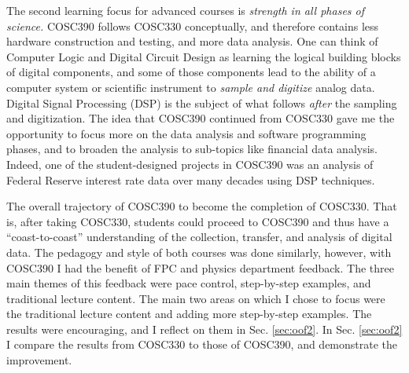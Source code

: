 \documentclass[../../../main.tex]{subfiles}
\begin{document}
The second learning focus for advanced courses is \textit{strength in all phases of science.}  COSC390 follows COSC330 conceptually, and therefore contains less hardware construction and testing, and more data analysis.  One can think of Computer Logic and Digital Circuit Design as learning the logical building blocks of digital components, and some of those components lead to the ability of a computer system or scientific instrument to \textit{sample and digitize} analog data.  Digital Signal Processing (DSP) is the subject of what follows \textit{after} the sampling and digitization.  The idea that COSC390 continued from COSC330 gave me the opportunity to focus more on the data analysis and software programming phases, and to broaden the analysis to sub-topics like financial data analysis.  Indeed, one of the student-designed projects in COSC390 was an analysis of Federal Reserve interest rate data over many decades using DSP techniques. \\ \hspace{0.1cm}

The overall trajectory of COSC390 to become the completion of COSC330.  That is, after taking COSC330, students could proceed to COSC390 and thus have a ``coast-to-coast'' understanding of the collection, transfer, and analysis of digital data.  The pedagogy and style of both courses was done similarly, however, with COSC390 I had the benefit of FPC and physics department feedback.  The three main themes of this feedback were pace control, step-by-step examples, and traditional lecture content.  The main two areas on which I chose to focus were the traditional lecture content and adding more step-by-step examples.  The results were encouraging, and I reflect on them in Sec. \ref{sec:oof2}.  In Sec. \ref{sec:oof2} I compare the results from COSC330 to those of COSC390, and demonstrate the improvement. \\ \hspace{0.1cm}
\end{document}
